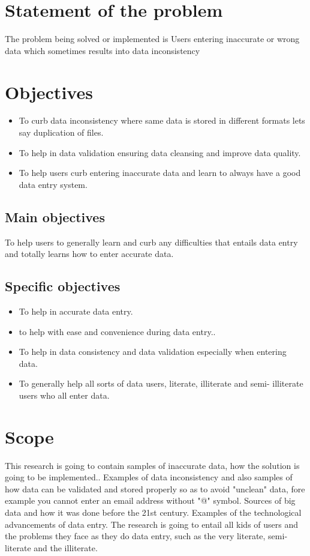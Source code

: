 \documentclass[12pt,]{article}
\begin{document}
\section{Statement of the problem}
The problem being solved or implemented is Users entering inaccurate or wrong data which sometimes results into data inconsistency
\section{ Objectives}
\begin{itemize}
\item To curb data inconsistency where same data is stored in different formats lets say duplication of files.
\item To help in data validation ensuring data cleansing and improve data quality.
\item To help users curb entering inaccurate data and learn to always have a good data entry system.
\end{itemize}
\subsection*{ Main objectives}
To help users to generally learn and curb any difficulties that entails data entry and totally learns how to enter accurate data.
\subsection*{Specific objectives}
\begin{itemize}
\item To help in accurate data entry.
\item to help with ease and convenience during data entry..
\item To help in data consistency and data validation especially when entering data.
\item To generally help all sorts of data users, literate, illiterate and semi- illiterate users who all enter data.
\end{itemize}

\section{Scope}
This research is going to contain samples of inaccurate data, how the solution is going to be implemented.. Examples of data inconsistency and also samples of how data can be validated and stored properly so as to avoid "unclean" data, fore example you cannot enter an email address without "@" symbol. Sources of big data and how it was done before the 21st century. Examples of the technological advancements of data entry. The research is going to entail all kids of users and the problems they face as they do data entry, such as the very literate, semi-literate and the illiterate. 
\end{document}
